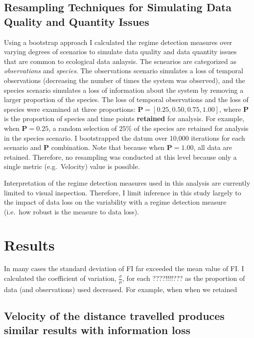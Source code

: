\documentclass[12pt,twoside,openany]{reedthesis}
\begin{document}
\subsection{Resampling Techniques for Simulating Data Quality and
Quantity
Issues}\label{resampling-techniques-for-simulating-data-quality-and-quantity-issues}

Using a bootstrap approach I calculated the regime detection measures
over varying degrees of scenarios to simulate data quality and data
quantity issues that are common to ecological data anlaysis. The
scnearios are categorized as \emph{observations} and \emph{species}. The
observations scenario simulates a loss of temporal observations
(decreasing the number of times the system was observed), and the
species scenario simulates a loss of information about the system by
removing a larger proportion of the species. The loss of temporal
observations and the loss of species were examined at three proportions:
\(\textbf{P} = [0.25, 0.50, 0.75, 1.00]\), where \(\textbf{P}\) is the
proportion of species and time points \textbf{retained} for analysis.
For example, when \(\textbf{P} = 0.25\), a random selection of \(25\%\)
of the species are retained for analysis in the species scenario. I
bootstrapped the datum over 10,000 iterations for each scenario and
\(\textbf{P}\) combination. Note that because when
\(\textbf{P} = 1.00\), all data are retained. Therefore, no resampling
was conducted at this level because only a single metric (e.g.~Velocity)
value is possible.

Interpretation of the regime detection measures used in this analysis
are currently limited to visual inspection. Therefore, I limit inference
in this study largely to the impact of data loss on the variability with
a regime detection measure (i.e.~how robust is the measure to data
loss).

\section{Results}\label{results-2}

In many cases the standard deviation of FI far exceeded the mean value
of FI. I calculated the coefficient of variation,
\(\frac{\sigma}{\mu}\), for each ????!!!!??? as the proportion of data
(and observations) used decreased. For example, when when we retained

\subsection{Velocity of the distance travelled produces similar results
with information
loss}\label{velocity-of-the-distance-travelled-produces-similar-results-with-information-loss}
\end{document}
